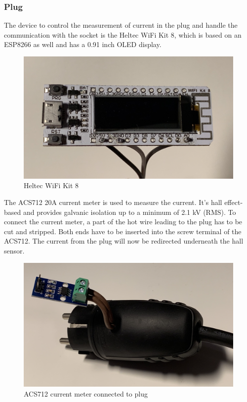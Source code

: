 \subsubsection{Plug}
The device to control the measurement of current in the plug and handle the communication with the socket is the Heltec WiFi Kit 8, which is based on an ESP8266 as well and has a 0.91 inch OLED display.
\\
\begin{figure}[h]
    \includegraphics[width=\textwidth]{img/heltec.jpg}
    \caption{Heltec WiFi Kit 8}
    \label{fig:heltec}
\end{figure}

The ACS712 20A current meter is used to measure the current. It’s hall effect-based and provides galvanic isolation up to a minimum of 2.1 kV (RMS)\cite{acs712}. To connect the current meter, a part of the hot wire leading to the plug has to be cut and stripped. Both ends have to be inserted into the screw terminal of the ACS712. The current from the plug will now be redirected underneath the hall sensor.
\\
\begin{figure}[h]
    \includegraphics[width=\textwidth]{img/acs712.jpg}
    \caption{ACS712 current meter connected to plug}
    \label{fig:acs712}
\end{figure}

